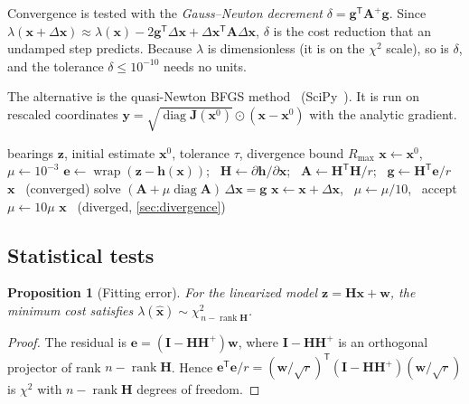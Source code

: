 \documentclass[11pt,a4paper]{article}
\newcommand{\x}{\bm{x}}
\newcommand{\xh}{\hat{\bm{x}}}
\newcommand{\z}{\bm{z}}
\newcommand{\e}{\bm{e}}
\newcommand{\g}{\bm{g}}
\newcommand{\T}{^{\mathsf{T}}}
\newcommand{\J}{\bm{J}}
\newcommand{\Hm}{\bm{H}}
\newcommand{\Id}{\bm{I}}
\DeclareMathOperator{\wrap}{wrap}
\DeclareMathOperator{\diag}{diag}
\DeclareMathOperator{\rank}{rank}
\theoremstyle{plain}
\newtheorem{proposition}{Proposition}
\theoremstyle{remark}
\begin{document}
Convergence is tested with the \emph{Gauss--Newton decrement}
$\delta = \g\T\bm{A}^{+}\g$. Since
$\lambda(\x+\Delta\x)\approx\lambda(\x)-2\g\T\Delta\x+\Delta\x\T\bm A\Delta\x$,
$\delta$ is the cost reduction that an undamped step predicts. Because
$\lambda$ is dimensionless (it is on the $\chi^2$ scale), so is $\delta$, and
the tolerance $\delta\le10^{-10}$ needs no units.

The alternative is the quasi-Newton BFGS method~\cite{nocedal06}
(SciPy~\cite{scipy20}). It is run on rescaled coordinates
$\bm{y}=\sqrt{\diag\J(\x^0)}\odot(\x-\x^0)$ with the analytic gradient.

\begin{algorithm}[htbp]
\caption{Gauss--Newton with Levenberg--Marquardt damping (step B5).}
\label{alg:lm}
\begin{algorithmic}[1]
\Require bearings $\z$, initial estimate $\x^0$, tolerance $\tau$, divergence bound $R_{\max}$
\State $\x\gets\x^0$, \ $\mu\gets10^{-3}$
  \State $\e\gets\wrap(\z-\bm h(\x))$; \ $\Hm\gets\partial\bm h/\partial\x$; \ $\bm A\gets\Hm\T\Hm/r$; \ $\g\gets\Hm\T\e/r$
  \If{$\g\T\bm A^{+}\g\le\tau$} \Return $\x$ \ (converged) \EndIf
  \Repeat
     \State solve $(\bm A+\mu\diag\bm A)\,\Delta\x=\g$
     \If{$\lambda(\x+\Delta\x)<\lambda(\x)$} \State $\x\gets\x+\Delta\x$, \ $\mu\gets\mu/10$, \ accept
     \Else \State $\mu\gets10\mu$ \EndIf
  \If{$\max_k\rho_k(\x)>R_{\max}$} \Return $\x$ \ (diverged, \cref{sec:divergence}) \EndIf
\EndFor
\end{algorithmic}
\end{algorithm}

\subsection{Statistical tests}
\label{sec:tests}

\begin{proposition}[Fitting error]
\label{prop:fit}
For the linearized model $\z = \Hm\x + \bm w$, the minimum cost satisfies
$\lambda(\xh)\sim\chi^2_{\,n-\rank\Hm}$.
\end{proposition}
\begin{proof}
The residual is $\e = (\Id-\Hm\Hm^{+})\bm w$, where $\Id-\Hm\Hm^+$ is an
orthogonal projector of rank $n-\rank\Hm$. Hence
$\e\T\e/r = (\bm w/\sqrt r)\T(\Id-\Hm\Hm^+)(\bm w/\sqrt r)$ is $\chi^2$ with
$n-\rank\Hm$ degrees of freedom.
\end{proof}
\end{document}
